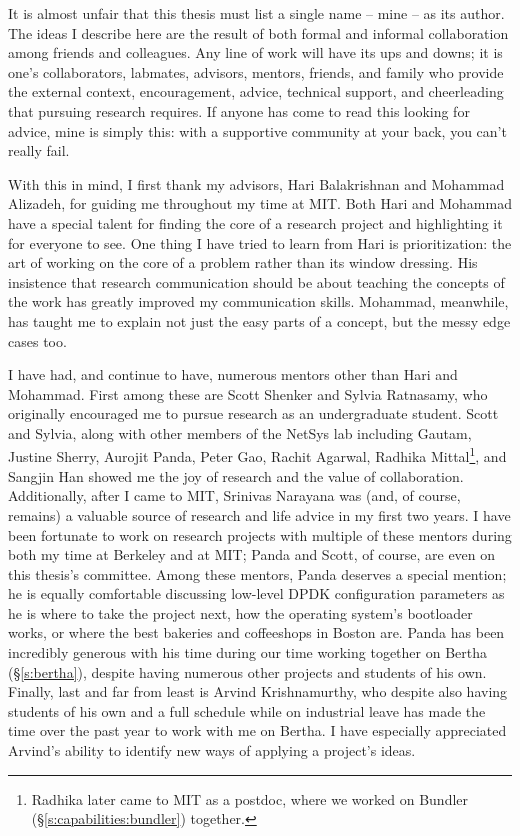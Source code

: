 It is almost unfair that this thesis must list a single name -- \ie mine -- as its author. The ideas I describe here are the result of both formal and informal collaboration among friends and colleagues.
Any line of work will have its ups and downs; it is one's collaborators, labmates, advisors, mentors, friends, and family who provide the external context, encouragement, advice, technical support, and cheerleading that pursuing research requires. 
If anyone has come to read this looking for advice, mine is simply this: with a supportive community at your back, you can't really fail.

With this in mind, I first thank my advisors, Hari Balakrishnan and Mohammad Alizadeh, for guiding me throughout my time at MIT. Both Hari and Mohammad have a special talent for finding the core of a research project and highlighting it for everyone to see. 
One thing I have tried to learn from Hari is prioritization: the art of working on the core of a problem rather than its window dressing.
His insistence that research communication should be about teaching the concepts of the work has greatly improved my communication skills.
Mohammad, meanwhile, has taught me to explain not just the easy parts of a concept, but the messy edge cases too.

I have had, and continue to have, numerous mentors other than Hari and Mohammad. First among these are Scott Shenker and Sylvia Ratnasamy, who originally encouraged me to pursue research as an undergraduate student. Scott and Sylvia, along with other members of the NetSys lab including Gautam, Justine Sherry, Aurojit Panda, Peter Gao, Rachit Agarwal, Radhika Mittal\footnote{Radhika later came to MIT as a postdoc, where we worked on Bundler (\S\ref{s:capabilities:bundler}) together.}, and Sangjin Han showed me the joy of research and the value of collaboration. 
Additionally, after I came to MIT, Srinivas Narayana was (and, of course, remains) a valuable source of research and life advice in my first two years.
I have been fortunate to work on research projects with multiple of these mentors during both my time at Berkeley and at MIT; Panda and Scott, of course, are even on this thesis's committee.
Among these mentors, Panda deserves a special mention; he is equally comfortable discussing low-level DPDK configuration parameters as he is where to take the project next, how the operating system's bootloader works, or where the best bakeries and coffeeshops in Boston are. 
Panda has been incredibly generous with his time during our time working together on Bertha (\S\ref{s:bertha}), despite having numerous other projects and students of his own.
Finally, last and far from least is Arvind Krishnamurthy, who despite also having students of his own and a full schedule while on industrial leave has made the time over the past year to work with me on Bertha. I have especially appreciated Arvind's ability to identify new ways of applying a project's ideas.

